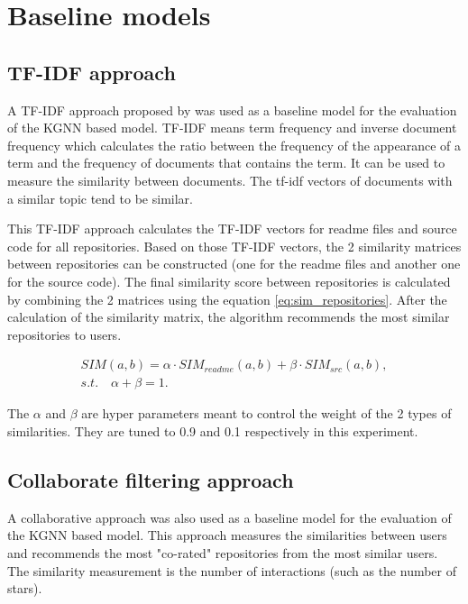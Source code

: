 \documentclass[11pt,twoside]{report}
\begin{document}
\section{Baseline models}
\subsection{TF-IDF approach}
A TF-IDF approach proposed by \cite{sun_personalized_2018} was used as a baseline model for the evaluation of the KGNN based model. TF-IDF means term frequency and inverse document frequency which calculates the ratio between the frequency of the appearance of a term and the frequency of documents that contains the term. It can be used to measure the similarity between documents. The tf-idf vectors of documents with a similar topic tend to be similar.

This TF-IDF approach calculates the TF-IDF vectors for readme files and source code for all repositories. Based on those TF-IDF vectors, the 2 similarity matrices between repositories can be constructed (one for the readme files and another one for the source code). The final similarity score between repositories is calculated by combining the 2 matrices using the equation \ref{eq:sim_repositories}. After the calculation of the similarity matrix, the algorithm recommends the most similar repositories to users.

\begin{gather}
    SIM(a,b)=\alpha\cdot{SIM_{readme}(a,b)}+\beta\cdot{SIM_{src}(a,b)}, \\
    s.t.\quad\alpha+\beta=1.
    \label{eq:sim_repositories}
\end{gather}

The $\alpha$ and $\beta$ are hyper parameters meant to control the weight of the 2 types of similarities. They are tuned to 0.9 and 0.1 respectively in this experiment.

\subsection{Collaborate filtering approach}
A collaborative approach \cite{guendouz_recommending_2015} was also used as a baseline model for the evaluation of the KGNN based model. This approach measures the similarities between users and recommends the most "co-rated" repositories from the most similar users. The similarity measurement is the number of interactions (such as the number of stars).
\end{document}
